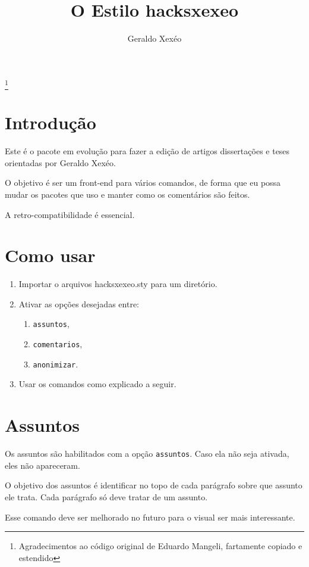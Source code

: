 \documentclass{article}
\title{O Estilo hacksxexeo}
\author{Geraldo Xexéo}
\begin{document}
\maketitle
\thanks{Agradecimentos ao código original de Eduardo Mangeli, fartamente copiado e estendido}

\section{Introdução}

Este é o pacote em evolução para fazer a edição de artigos dissertações e teses orientadas por Geraldo Xexéo.

O objetivo é ser um front-end para vários comandos, de forma que eu possa mudar os pacotes que uso e manter como os comentários são feitos.

A retro-compatibilidade é essencial.

\section{Como usar}

\begin{enumerate}
    \item Importar o arquivos hacksxexeo.sty para um diretório.
    \item Ativar as opções desejadas entre:
    \begin{enumerate}
        \item \verb!assuntos!,
        \item \verb!comentarios!,
        \item \verb!anonimizar!.
    \end{enumerate}
    \item Usar os comandos como explicado a seguir.
\end{enumerate}


\section{Assuntos}

Os assuntos são habilitados com a opção \verb!assuntos!. Caso ela não seja ativada, eles não apareceram.

O objetivo dos assuntos é identificar no topo de cada parágrafo sobre que assunto ele trata. Cada parágrafo só deve tratar de um assunto.

Esse comando deve ser melhorado no futuro para o visual ser mais interessante.
\end{document}
